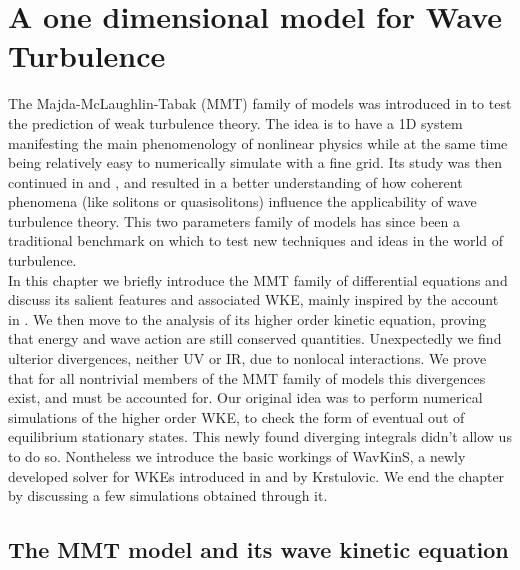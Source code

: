 

\newpage
\vphantom{}
\section{A one dimensional model for Wave Turbulence}
    The Majda-McLaughlin-Tabak (MMT) family of models was introduced in \cite{Majda1997} to test the prediction of weak turbulence theory. The idea is to have a 1D system manifesting
    the main phenomenology of nonlinear physics while at the same time being relatively easy to numerically simulate with a fine grid. Its study was then continued in
    \cite{Cai2001} and \cite{Zakharov2001}, and resulted in a better understanding of how coherent phenomena (like solitons or quasisolitons) influence the applicability 
    of wave turbulence theory. This two parameters family of models has since been a traditional benchmark on which to test new techniques and ideas in the world of turbulence. \\
    In this chapter we briefly introduce the MMT family of differential equations and discuss its salient features and associated WKE, mainly inspired by the account in 
    \cite{ZAKHAROV2004}. We then 
    move to the analysis of its higher order kinetic equation, proving that energy and wave action are still conserved quantities. Unexpectedly  we find 
    ulterior divergences, neither UV or IR, due to nonlocal interactions. We prove that for all nontrivial members of the MMT family of
    models this divergences exist, and must be accounted for. Our original idea was to perform numerical simulations of the higher order WKE, to check the form of eventual out of equilibrium stationary states. This newly found diverging integrals didn't allow us to do so. Nontheless we introduce the basic workings of WavKinS,
    a newly developed solver for WKEs introduced in \cite{Giorgio1} and \cite{Giorgio2} by Krstulovic. We end the chapter by discussing a few simulations obtained 
    through it. \\  
    \subsection{The MMT model and its wave kinetic equation}

